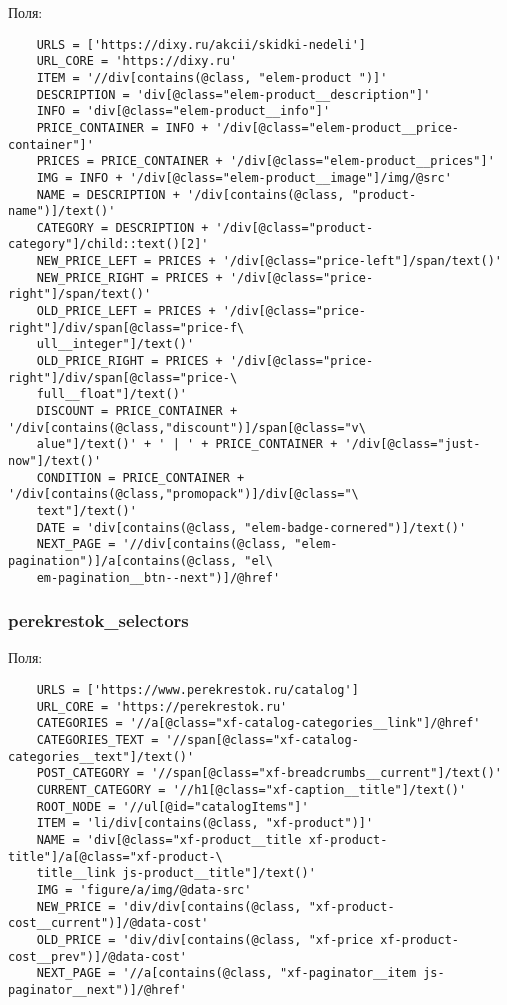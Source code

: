 Поля:\\
\begin{small}
    \begin{verbatim}
    URLS = ['https://dixy.ru/akcii/skidki-nedeli']
    URL_CORE = 'https://dixy.ru'
    ITEM = '//div[contains(@class, "elem-product ")]'
    DESCRIPTION = 'div[@class="elem-product__description"]'
    INFO = 'div[@class="elem-product__info"]'
    PRICE_CONTAINER = INFO + '/div[@class="elem-product__price-container"]'
    PRICES = PRICE_CONTAINER + '/div[@class="elem-product__prices"]'
    IMG = INFO + '/div[@class="elem-product__image"]/img/@src'
    NAME = DESCRIPTION + '/div[contains(@class, "product-name")]/text()'
    CATEGORY = DESCRIPTION + '/div[@class="product-category"]/child::text()[2]'
    NEW_PRICE_LEFT = PRICES + '/div[@class="price-left"]/span/text()'
    NEW_PRICE_RIGHT = PRICES + '/div[@class="price-right"]/span/text()'
    OLD_PRICE_LEFT = PRICES + '/div[@class="price-right"]/div/span[@class="price-f\
    ull__integer"]/text()'
    OLD_PRICE_RIGHT = PRICES + '/div[@class="price-right"]/div/span[@class="price-\
    full__float"]/text()'
    DISCOUNT = PRICE_CONTAINER + '/div[contains(@class,"discount")]/span[@class="v\
    alue"]/text()' + ' | ' + PRICE_CONTAINER + '/div[@class="just-now"]/text()'
    CONDITION = PRICE_CONTAINER + '/div[contains(@class,"promopack")]/div[@class="\
    text"]/text()'
    DATE = 'div[contains(@class, "elem-badge-cornered")]/text()'
    NEXT_PAGE = '//div[contains(@class, "elem-pagination")]/a[contains(@class, "el\
    em-pagination__btn--next")]/@href'
    \end{verbatim}
\end{small}


\subsubsection{perekrestok\_selectors}

Поля:\\
\begin{small}
    \begin{verbatim}
    URLS = ['https://www.perekrestok.ru/catalog']
    URL_CORE = 'https://perekrestok.ru'
    CATEGORIES = '//a[@class="xf-catalog-categories__link"]/@href'
    CATEGORIES_TEXT = '//span[@class="xf-catalog-categories__text"]/text()'
    POST_CATEGORY = '//span[@class="xf-breadcrumbs__current"]/text()'
    CURRENT_CATEGORY = '//h1[@class="xf-caption__title"]/text()'
    ROOT_NODE = '//ul[@id="catalogItems"]'
    ITEM = 'li/div[contains(@class, "xf-product")]'
    NAME = 'div[@class="xf-product__title xf-product-title"]/a[@class="xf-product-\
    title__link js-product__title"]/text()'
    IMG = 'figure/a/img/@data-src'
    NEW_PRICE = 'div/div[contains(@class, "xf-product-cost__current")]/@data-cost'
    OLD_PRICE = 'div/div[contains(@class, "xf-price xf-product-cost__prev")]/@data-cost'
    NEXT_PAGE = '//a[contains(@class, "xf-paginator__item js-paginator__next")]/@href'
    \end{verbatim}
\end{small}


